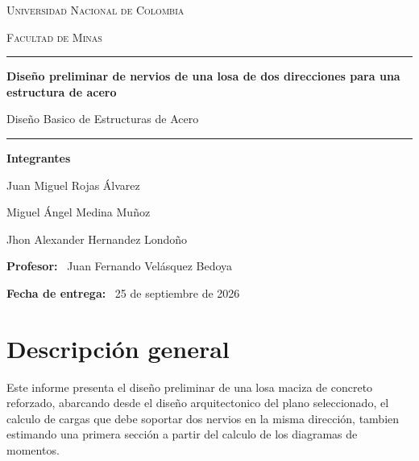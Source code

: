 ﻿\documentclass[12pt,letterpaper]{article}
\begin{document}
\shorthandoff{<>}

\begin{titlepage}
    \centering
    \vspace*{1cm}

    {\Large \scshape Universidad Nacional de Colombia\par}
    \vspace{0.3cm}
    {\large \scshape Facultad de Minas\par}

    \vspace{0.5cm}
    \rule{\linewidth}{0.4pt}
    \vspace{1cm}

    {\Huge \textbf{Diseño preliminar de nervios de una losa de dos direcciones para una estructura de acero}\par}
    \vspace{0.6cm}

    \vspace{0.3cm}
    {\large Diseño Basico de Estructuras de Acero\par}

    \vspace{1cm}
    \rule{\linewidth}{0.4pt}

    \vfill

    {\bfseries Integrantes\par}
    \vspace{0.4cm}
    Juan Miguel Rojas Álvarez\par
    Miguel Ángel Medina Muñoz\par
    Jhon Alexander Hernandez Londoño\par

    \vspace{0.8cm}

    \textbf{Profesor:} \, Juan Fernando Velásquez Bedoya\par
    \vspace{0.3cm}
    \textbf{Fecha de entrega:} \, 25 de septiembre de 2026
\end{titlepage}

\tableofcontents
\newpage
{}

\section{Descripción general}

Este informe presenta el diseño preliminar de una losa maciza de concreto reforzado, abarcando desde el diseño arquitectonico del plano seleccionado, el calculo de cargas que debe soportar dos nervios en la misma dirección, tambien estimando una primera sección a partir del calculo de los diagramas de momentos.
\end{document}
